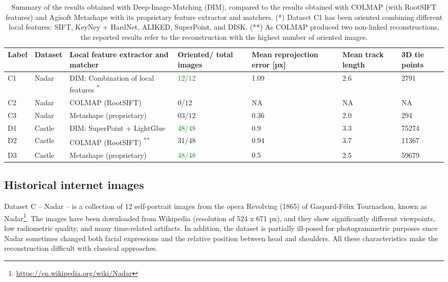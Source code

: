 \begin{table}[ht]
    \centering
    \caption{Summary of the results obtained with Deep-Image-Matching (DIM), compared to the results obtained with COLMAP (with RootSIFT features) and Agisoft Metashape with its proprietary feature extractor and matchers. (*) Dataset C1 has been oriented combining different local features: SIFT, KeyNey + HardNet, ALIKED, SuperPoint, and DISK.  (**) As COLMAP produced two non-linked reconstructions, the reported results refer to the reconstruction with the highest number of oriented images.} 
    \label{tab:5:statistics_summary}
    
    \begin{tabular}{l p{1cm} p{4cm} p{1.5cm} p{1.5cm} p{1.5cm} p{1.5cm}}
    \toprule
    \textbf{Label} & \textbf{Dataset} & \textbf{Local feature extractor and matcher} & \textbf{Oriented/} \newline\textbf{total images} & \textbf{Mean reprojection error [px]} & \textbf{Mean track length} &  \textbf{3D tie points}\\
    \midrule
    C1  & Nadar     & DIM: Combination of local features \textsuperscript{*}    & \textcolor{green}{12/12}     & 1.09  & 2.6   & 2791 \\
    C2  & Nadar     & COLMAP (RootSIFT)                     & 0/12      & NA    & NA    & NA   \\
    C3  & Nadar     & Metashape (proprietary)               & 03/12     & 0.36  & 2.0   & 294  \\ \hline
    D1  & Castle    & DIM: SuperPoint + LightGlue           & \textcolor{green}{48/48}     & 0.9   & 3.3   & 75274 \\
    D2  & Castle    & COLMAP (RootSIFT) \textsuperscript{**} & 31/48     & 0.94  & 3.7   & 11367 \\
    D3  & Castle    & Metashape (proprietary)               & \textcolor{green}{48/48}     & 0.5   & 2.5   & 59679 \\ 
    \bottomrule
    \end{tabular}
\end{table}

\subsection{Historical internet images}

Dataset C – Nadar – is a collection of 12 self-portrait images from the opera Revolving (1865) of Gaspard-Félix Tournachon, known as Nadar\footnote{\url{https://en.wikipedia.org/wiki/Nadar}}. 
The images have been downloaded from Wikipedia (resolution of 524 x 671 px), and they show significantly different viewpoints, low radiometric quality, and many time-related artifacts. 
In addition, the dataset is partially ill-posed for photogrammetric purposes since Nadar sometimes changed both facial expressions and the relative position between head and shoulders. 
All these characteristics make the reconstruction difficult with classical approaches.

